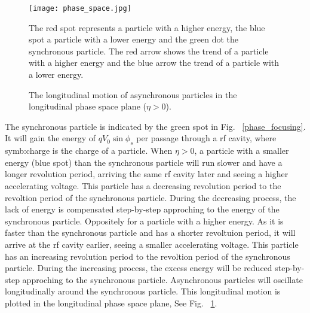 \begin{figure}[!htb]
   \centering   
   \texttt{[image: phase\_space.jpg]}
   \caption{The longitudinal motion of asynchronous particles in the longitudinal phase space plane ($\eta > 0$).}{The red spot represents a particle with a higher energy, the blue spot a particle with a lower energy and the green dot the synchronous particle. The red arrow shows the trend of a particle with a higher energy and the blue arrow the trend of a particle with a lower energy.}
   \label{phase_space}
\end{figure}
The synchronous particle is indicated by the green spot in Fig. ~\ref{phase_focusing}. It will gain the energy of $qV_0\sin\phi_{\mathit{s}}$ per passage through a rf cavity, where \gls{symb:charge} is the charge of a particle.  When $\eta > 0$, a particle with a smaller energy (blue spot) than the synchronous particle will run slower and have a longer revolution period, arriving the same rf cavity later and seeing a higher accelerating voltage. This particle has a decreasing revolution period to the revoltion period of the synchronous particle. During the decreasing process, the lack of energy is compensated step-by-step approching to the energy of the synchronous particle. Oppositely for a particle with a higher energy. As it is faster than the synchronous particle and has a shorter revoltuion period, it will arrive at the rf cavity earlier, seeing a smaller accelerating voltage. This particle has an increasing revolution period to the revoltion period of the synchronous particle. During the increasing process, the excess energy will be reduced step-by-step approching to the synchronous particle. Asynchronous particles will oscillate longitudinally around the synchronous particle. This longitudinal motion is plotted in the longitudinal phase space plane, See Fig. ~\ref{phase_space}.

